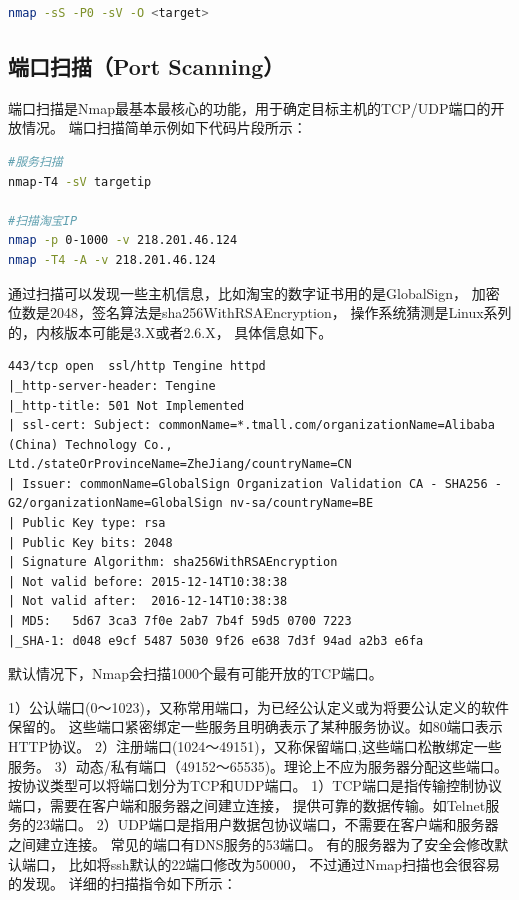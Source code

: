 \documentclass{book}
\begin{document}
\begin{lstlisting}[language=Bash]
nmap -sS -P0 -sV -O <target>
\end{lstlisting}

\subsection{端口扫描（Port Scanning）}

端口扫描是Nmap最基本最核心的功能，用于确定目标主机的TCP/UDP端口的开放情况。
端口扫描简单示例如下代码片段所示：

\begin{lstlisting}[language=Bash]
#服务扫描
nmap-T4 -sV targetip 

#扫描淘宝IP
nmap -p 0-1000 -v 218.201.46.124
nmap -T4 -A -v 218.201.46.124
\end{lstlisting}

通过扫描可以发现一些主机信息，比如淘宝的数字证书用的是GlobalSign，
加密位数是2048，签名算法是sha256WithRSAEncryption，
操作系统猜测是Linux系列的，内核版本可能是3.X或者2.6.X，
具体信息如下。

\begin{lstlisting}
443/tcp open  ssl/http Tengine httpd
|_http-server-header: Tengine
|_http-title: 501 Not Implemented
| ssl-cert: Subject: commonName=*.tmall.com/organizationName=Alibaba (China) Technology Co., Ltd./stateOrProvinceName=ZheJiang/countryName=CN
| Issuer: commonName=GlobalSign Organization Validation CA - SHA256 - G2/organizationName=GlobalSign nv-sa/countryName=BE
| Public Key type: rsa
| Public Key bits: 2048
| Signature Algorithm: sha256WithRSAEncryption
| Not valid before: 2015-12-14T10:38:38
| Not valid after:  2016-12-14T10:38:38
| MD5:   5d67 3ca3 7f0e 2ab7 7b4f 59d5 0700 7223
|_SHA-1: d048 e9cf 5487 5030 9f26 e638 7d3f 94ad a2b3 e6fa
\end{lstlisting}

默认情况下，Nmap会扫描1000个最有可能开放的TCP端口。

1）公认端口(0～1023)，又称常用端口，为已经公认定义或为将要公认定义的软件保留的。
这些端口紧密绑定一些服务且明确表示了某种服务协议。如80端口表示HTTP协议。
2）注册端口(1024～49151)，又称保留端口,这些端口松散绑定一些服务。
3）动态/私有端口（49152～65535)。理论上不应为服务器分配这些端口。
按协议类型可以将端口划分为TCP和UDP端口。
1）TCP端口是指传输控制协议端口，需要在客户端和服务器之间建立连接，
提供可靠的数据传输。如Telnet服务的23端口。
2）UDP端口是指用户数据包协议端口，不需要在客户端和服务器之间建立连接。
常见的端口有DNS服务的53端口。
有的服务器为了安全会修改默认端口，
比如将ssh默认的22端口修改为50000，
不过通过Nmap扫描也会很容易的发现。
详细的扫描指令如下所示：
\end{document}
